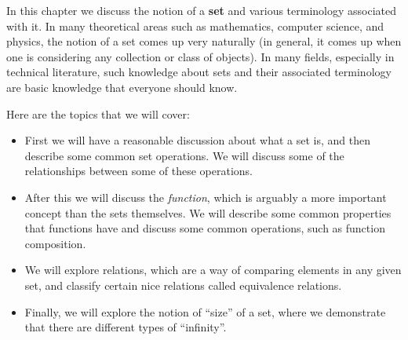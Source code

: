 In this chapter we discuss the notion of a \textbf{set} and various terminology associated with it. In many theoretical areas such as mathematics, computer science, and physics, the notion of a set comes up very naturally (in general, it comes up when one is considering any collection or class of objects). In many fields, especially in technical literature, such knowledge about sets and their associated terminology are basic knowledge that everyone should know.

Here are the topics that we will cover:
\begin{itemize}
	\item First we will have a reasonable discussion about what a set is, and then describe some common set operations. We will discuss some of the relationships between some of these operations. 
	\item After this we will discuss the \textit{function}, which is arguably a more important concept than the sets themselves. We will describe some common properties that functions have and discuss some common operations, such as function composition. 
	\item We will explore relations, which are a way of comparing elements in any given set, and classify certain nice relations called equivalence relations.
	\item Finally, we will explore the notion of ``size'' of a set, where we demonstrate that there are different types of ``infinity''.
\end{itemize}